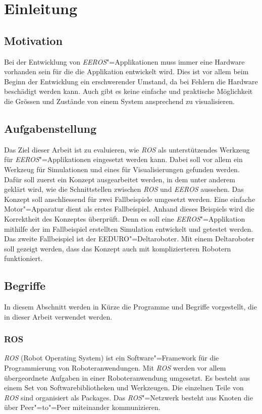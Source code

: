 \chapter{Einleitung}
\section{Motivation}
Bei der Entwicklung von \textit{EEROS}"=Applikationen muss immer eine Hardware vorhanden sein für die die Applikation entwickelt wird.
Dies ist vor allem beim Beginn der Entwicklung ein erschwerender Umstand, da bei Fehlern die Hardware beschädigt werden kann.
Auch gibt es keine einfache und praktische Möglichkeit die Grössen und Zustände von einem System ansprechend zu visualisieren.


\section{Aufgabenstellung}
Das Ziel dieser Arbeit ist zu evaluieren, wie \textit{ROS} als unterstützendes Werkzeug für \textit{EEROS}"=Applikationen eingesetzt werden kann.
Dabei soll vor allem ein Werkzeug für Simulationen und eines für Visualisierungen gefunden werden.
Dafür soll zuerst ein Konzept ausgearbeitet werden, in dem unter anderem geklärt wird, wie die Schnittstellen zwischen \textit{ROS} und \textit{EEROS} aussehen.
Das Konzept soll anschliessend für zwei Fallbeispiele umgesetzt werden.
Eine einfache Motor"=Apparatur dient als erstes Fallbeispiel.
Anhand dieses Beispiels wird die Korrektheit des Konzeptes überprüft.
Denn es soll eine \textit{EEROS}"=Applikation mithilfe der im Fallbeispiel erstellten Simulation entwickelt und getestet werden.
Das zweite Fallbeispiel ist der EEDURO"=Deltaroboter.
Mit einem Deltaroboter soll gezeigt werden, dass das Konzept auch mit komplizierteren Robotern funktioniert.

\section{Begriffe}
In diesem Abschnitt werden in Kürze die Programme und Begriffe vorgestellt, die in dieser Arbeit verwendet werden.

\subsection{ROS}
\textit{ROS} (Robot Operating System) ist ein Software"=Framework für die Programmierung von Roboteranwendungen.
Mit \textit{ROS} werden vor allem übergeordnete Aufgaben in einer Roboteranwendung umgesetzt.
Es besteht aus einem Set von Softwarebibliotheken und Werkzeugen.
Die einzelnen Teile von \textit{ROS} sind organisiert als Packages.
Das \textit{ROS}"=Netzwerk besteht aus Knoten die über Peer"=to"=Peer miteinander kommunizieren.


